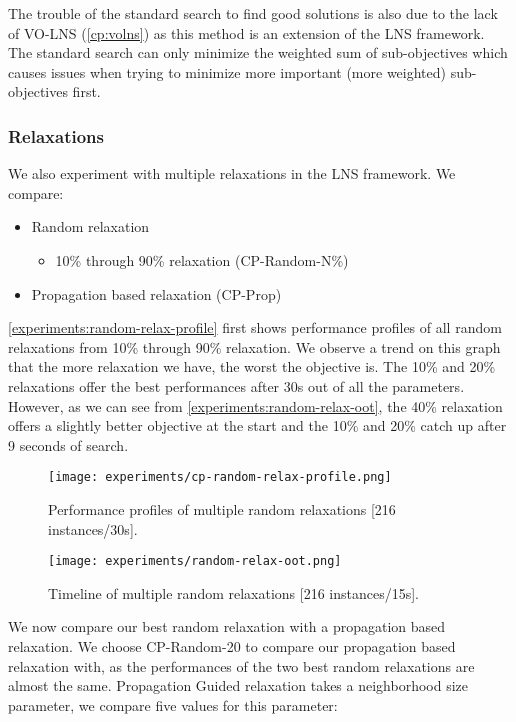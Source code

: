 \documentclass[../../thesis.tex]{subfiles}
\begin{document}
\FloatBarrier

The trouble of the standard search to find good solutions is also due to the lack of VO-LNS (\autoref{cp:volns}) as 
this method is an extension of the LNS framework. The standard search can only minimize the weighted sum of sub-objectives
which causes issues when trying to minimize more important (more weighted) sub-objectives first.


\subsubsection{Relaxations}

We also experiment with multiple relaxations in the LNS framework. We compare:

\begin{itemize}
  \item Random relaxation 
    \begin{itemize}
      \item 10\% through 90\% relaxation (CP-Random-N\%)
    \end{itemize}
  \item Propagation based relaxation (CP-Prop)
\end{itemize}

\autoref{experiments:random-relax-profile} first shows performance profiles of all random relaxations 
from 10\% through 90\% relaxation. We observe a trend on this graph that the more relaxation we have,
the worst the objective is. The 10\% and 20\% relaxations offer the best performances after 30s out of all 
the parameters. However, as we can see from \autoref{experiments:random-relax-oot}, the 40\% relaxation 
offers a slightly better objective at the start and the 10\% and 20\% catch up after 9 seconds of search.


\begin{figure}[H]
  \centering
  \texttt{[image: experiments/cp-random-relax-profile.png]}
  \caption{Performance profiles of multiple random relaxations [216 instances/30s].}
  \label{experiments:random-relax-profile}
\end{figure}

\begin{figure}[H]
  \centering
  \texttt{[image: experiments/random-relax-oot.png]}
  \caption{Timeline of multiple random relaxations [216 instances/15s].}
  \label{experiments:random-relax-oot}
\end{figure}


We now compare our best random relaxation with a propagation based relaxation.
We choose CP-Random-20 to compare our propagation based relaxation with, as the performances of 
the two best random relaxations are almost the same.
Propagation Guided relaxation takes a neighborhood size parameter, we compare five values for this parameter:
\end{document}
